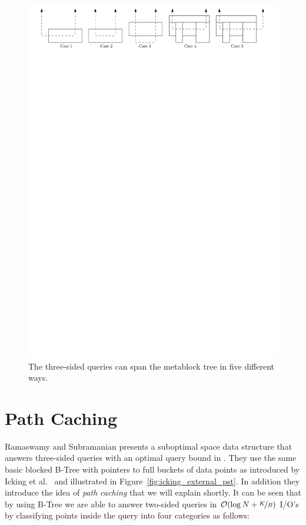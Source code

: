 \documentclass[twoside,11pt,openright]{report}
\begin{document}
\begin{figure}[h]
	\centering
		\includegraphics[width=1\textwidth]{../figures/kanellakis_queries}
	\caption{The three-sided queries can span the metablock tree in five different ways.}
	\label{fig:kanellakis_queries}
\end{figure}

\chapter{Path Caching}
\label{chp:ramaswamy}

Ramaswamy and Subramanian presents a suboptimal space data structure that answers three-sided queries with an optimal query bound in \cite{Ramaswamy:1994:PCT:182591.182595}. They use the same basic blocked B-Tree with pointers to full buckets of data points as introduced by Icking et al.~\cite{Icking1988} and illustrated in Figure~\ref{fig:icking_external_pst}. In addition they introduce the idea of \textit{path caching} that we will explain shortly. It can be seen that by using B-Tree we are able to answer two-sided queries in $\mathcal{O}(\log N + \nicefrac{K}{B})$ I/O's by classifying points inside the query into four categories as follows:
\end{document}
